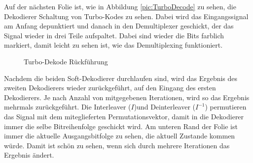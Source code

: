Auf der nächsten Folie ist, wie in Abbildung \ref{pic:TurboDecode} zu sehen, die Dekodierer Schaltung von Turbo-Kodes zu sehen. Dabei wird das Eingangssignal am Anfang depunktiert und danach in den Demultiplexer geschickt, der das Signal wieder in drei Teile aufspaltet. Dabei sind wieder die Bits farblich markiert, damit leicht zu sehen ist, wie das Demultiplexing funktioniert.

\begin{figure}[!ht]
\centering
{}
\caption{Turbo-Dekode Rückführung}
\label{pic:TurboDecodeBack}
\end{figure}

Nachdem die beiden Soft-Dekodierer durchlaufen sind, wird das Ergebnis des zweiten Dekodierers wieder zurückgeführt, auf den Eingang des ersten Dekodierers. Je nach Anzahl von mitgegebenen Iterationen, wird so das Ergebnis mehrmals zurückgeführt. Die Interleaver ($I$)und Deinterleaver ($I^{-1}$) permutieren das Signal mit dem miteglieferten Permutationsvektor, damit in die Dekodierer immer die selbe Bitreihenfolge geschickt wird. Am unteren Rand der Folie ist immer die aktuelle Ausgangsbitfolge zu sehen, die aktuell Zustande kommen würde. Damit ist schön zu sehen, wenn sich durch mehrere Iterationen das Ergebnis ändert.

